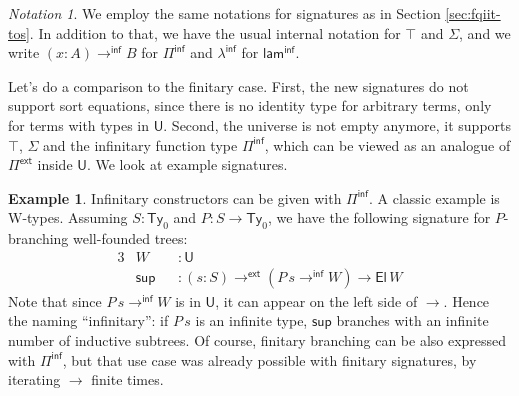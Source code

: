 \documentclass[12pt,a4paper,twoside,openany]{book}
\theoremstyle{remark}
\newtheorem{notation}{Notation}
\theoremstyle{definition}
\newtheorem{myexample}{Example}
\theoremstyle{theorem}
\newcommand{\ms}[1]{\mathsf{#1}}
\newcommand{\Ty}{\mathsf{Ty}}
\newcommand{\U}{\mathsf{U}}
\newcommand{\El}{\mathsf{El}}
\newcommand{\Pie}{\Pi^{\mathsf{ext}}}
\newcommand{\toe}{\to^{\ms{ext}}}
\newcommand{\Piinf}{\Pi^{\mathsf{inf}}}
\newcommand{\laminf}{\mathsf{lam^{inf}}}
\newcommand{\toinf}{\to^{\ms{inf}}}
\newcommand{\lambdainf}{\lambda^{\ms{inf}}}
\begin{document}
\begin{notation}
  We employ the same notations for signatures as in Section \ref{sec:fqiit-tos}. In addition to that,
  we have the usual internal notation for $\top$ and $\Sigma$, and we write $(x : A) \toinf B$ for $\Piinf$
  and $\lambdainf$ for $\laminf$.
\end{notation}

Let's do a comparison to the finitary case. First, the new signatures do not
support sort equations, since there is no identity type for arbitrary terms,
only for terms with types in $\U$. Second, the universe is not empty anymore, it
supports $\top$, $\Sigma$ and the infinitary function type $\Piinf$, which can
be viewed as an analogue of $\Pie$ inside $\U$. We look at example signatures.

\begin{myexample}
Infinitary constructors can be given with $\Piinf$. A classic example is
W-types. Assuming $S : \Ty_0$ and $P : S \to \Ty_0$, we have the following
signature for $P$-branching well-founded trees:
\begin{alignat*}{3}
  &W &&: \U\\
  &\ms{sup} &&: (s : S) \toe (P\,s \toinf W) \to \El\,W
\end{alignat*}
Note that since $P\,s \toinf W$ is in $\U$, it can appear on the left side of
$\to$. Hence the naming ``infinitary'': if $P\,s$ is an infinite type,
$\ms{sup}$ branches with an infinite number of inductive subtrees. Of course,
finitary branching can be also expressed with $\Piinf$, but that use case was
already possible with finitary signatures, by iterating $\to$ finite times.
\end{myexample}
\end{document}
